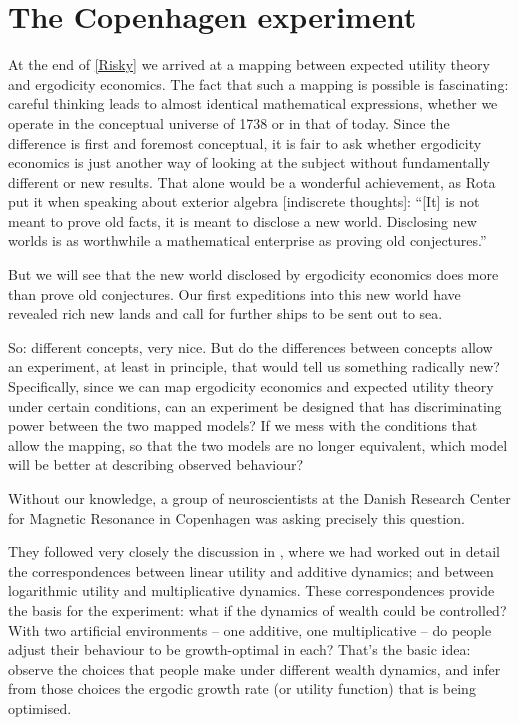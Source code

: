 \section{The Copenhagen experiment}
At the end of \cref{Risky} we arrived at a mapping between expected utility 
theory and ergodicity economics. The fact that such a mapping is possible is fascinating: careful 
thinking leads to almost identical mathematical expressions, whether we operate in the conceptual
universe of 1738 or in that of today. Since the difference is first and foremost conceptual, 
it is fair to ask whether ergodicity economics is just another way of looking at the subject
without fundamentally different or new results. That alone would be a wonderful achievement,
as Rota put it when speaking about exterior algebra \cite[p.48]{Rota} [indiscrete thoughts]: 
``[It] is not meant to prove old facts, it is meant to disclose a new world. Disclosing new 
worlds is as worthwhile a mathematical enterprise as proving old conjectures.''

But we will see that the new world disclosed by ergodicity economics does more than 
prove old conjectures. Our first expeditions into this new world have revealed rich 
new lands and call for further ships to be sent out to sea.

So: different concepts, very nice. But do the differences between concepts allow an experiment, 
at least in principle, that would tell us something radically new? Specifically, since we can 
map ergodicity economics and expected utility theory under certain conditions, can an experiment
be designed that has discriminating power between the two mapped models? If we mess with the
conditions that allow the mapping, so that the two models are no longer equivalent, which model
will be better at describing observed behaviour?

Without our knowledge, a group of neuroscientists at the Danish Research Center for Magnetic 
Resonance in Copenhagen was asking precisely this question.

They followed very closely the discussion in \cite{PetersGell-Mann2016}, where we had worked 
out in detail the correspondences between linear utility and additive dynamics; and between 
logarithmic utility and multiplicative dynamics. These correspondences provide the basis for 
the experiment: what if the dynamics of wealth could be controlled? With two artificial 
environments -- one additive,  one multiplicative -- do people adjust their behaviour to be 
growth-optimal in each? That's the basic idea: observe the choices that people make under
different wealth dynamics, and infer from those choices the ergodic growth rate (or utility 
function) that is being optimised.

